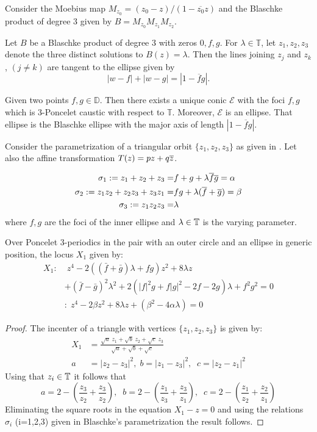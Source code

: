 Consider the Moebius map $M_{z_0}=(z_0-z)/(1-\overline{z_0} z)$ and the Blaschke product of degree 3 given by   $B=M_{z_0} M_{z_1} M_{z_2}$.
\begin{theorem}
Let $B$ be a Blaschke product of degree 3 with
zeros $0, f, g.$ For $\lambda \in \mathbb{T}$, let $z_1, z_2, z_3 $ denote the three distinct solutions to $ B(z) = \lambda$. Then the
lines joining $z_j$ and $z_k$, $(j \ne k)$ are tangent to the ellipse given by
\[|w - f| + |w - g| = |1 -   \overline{f}   g |.\]
\end{theorem}

\begin{theorem}
 Given two points $f,g\in\mathbb{D}$. Then there exists a unique conic $\mathcal{E}$ with the foci
$f,g$   which is 3-Poncelet caustic with respect to $\mathbb{T}$. Moreover, $\mathcal{E}$ is an ellipse. That ellipse is
the Blaschke ellipse with the major axis of length $|1-\overline{f}g|.$
\end{theorem}

Consider the parametrization of a triangular orbit $\{z_1,z_2,z_3\}$ as given in \cite{helman2021-power-loci}.
Let also the  affine transformation
$T(z)=pz+q\overline z$.
\begin{definition}
\begin{align*}
    \sigma_1:=z_1+z_2+z_3=& f+g+\lambda\overline f \overline g =\alpha\\
    \sigma_2:=z_1 z_2+z_2 z_3+z_3 z_1=& f g+\lambda(\overline f+\overline g) =\beta\\
    \sigma_3:=z_1 z_2 z_3=& \lambda
\end{align*}
where $f,g$ are the foci of the inner ellipse and $\lambda\in\mathbb{T}$ is the varying parameter.
\label{def:bla}
\end{definition}
\begin{proposition}\label{prop:X1c}
Over Poncelet 3-periodics in the pair with an outer circle and an ellipse in generic position, the locus $X_1$ given by:
\begin{align*}
  X_1:&\;z^4 - 2(( \bar{f} + \bar{g}) \lambda +  f g) z^2 + 8   \lambda z\\
  &+ (\bar{f} - \bar{g})^2 \lambda^2 +2 (  |f|^2 g +   f |g|^2 - 2 f - 2 g) \lambda + f^2 g^2=0\\
  \;&:\;  z^4 - 2\beta  z^2+ 8\lambda z+  (\beta^2-4\alpha\lambda) =0
\end{align*}
\end{proposition}

\begin{proof} The incenter of a triangle with vertices $\{z_1,z_2,z_3\}$ is given by:
\begin{align*}
    X_1&=\frac{\sqrt{a}\;z_1+\sqrt{b}\;z_2+\sqrt{c}\;z_3}{\sqrt{a}+\sqrt{b}+\sqrt{c}}\\
    a&=|z_2-z_3|^2, \; b=|z_1-z_3|^2, \;\; c=|z_2-z_1|^2
\end{align*}
Using that $z_i\in \mathbb{T}$ it follows that
\[a=2-(\frac{z_3}{z_2}+\frac{z_3}{z_2}),\;\; b=2-(\frac{z_1}{z_3}+\frac{z_3}{z_1}),\;\;c=2-(\frac{z_1}{z_2}+\frac{z_2}{z_1})\]
Eliminating the square roots in  the equation $X_1-z=0$ and using the relations  $\sigma_i$ (i=1,2,3) given in Blaschke's parametrization the result follows.
\end{proof}

